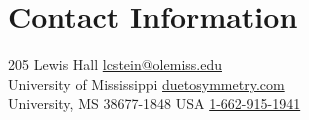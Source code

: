 \section{\sc Contact Information}
205 Lewis Hall      \hfill \href{mailto:lcstein@olemiss.edu}{lcstein@olemiss.edu}\\
University of Mississippi   \hfill \href{https://duetosymmetry.com/}{duetosymmetry.com}\\
University, MS 38677-1848 USA \hfill \href{tel:1-662-915-1941}{1-662-915-1941}


